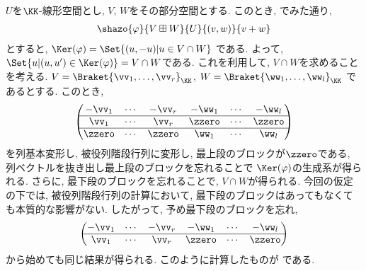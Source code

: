 \begin{remark}
  $U$を$\KK$-線形空間とし, $V$, $W$をその部分空間とする.
  このとき,
  でみた通り,
\begin{align*}
\shazo{\varphi}{V\boxplus W}{U}
{(v,w)}{v+w}
\end{align*}
とすると,
$\Ker(\varphi)=\Set{(u,-u) | u\in V\cap W}$
である.
よって,
$\Set{u|(u,u')\in \Ker(\varphi)}=V\cap W$である.
これを利用して, $V\cap W$を求めることを考える.
$V=\Braket{\vv_1,\ldots,\vv_r}_\KK$,
$W=\Braket{\ww_1,\ldots,\ww_l}_\KK$
であるとする.
このとき,
\begin{align*}
  \begin{pmatrix}
    -\vv_1&\cdots&-\vv_r&-\ww_1&\cdots&-\ww_l\\\hline
    \vv_1&\cdots&\vv_r&\zzero&\cdots&\zzero\\\hline
    \zzero&\cdots&\zzero&\ww_1&\cdots&\ww_l
  \end{pmatrix}
\end{align*}
を列基本変形し,
被役列階段行列に変形し, 最上段のブロックが$\zzero$である, 列ベクトルを抜き出し最上段のブロックを忘れることで
$\Ker(\varphi)$の生成系が得られる.
さらに, 最下段のブロックを忘れることで, $V\cap W$が得られる.
今回の仮定の下では,
被役列階段行列の計算において,
最下段のブロックはあってもなくても本質的な影響がない.
したがって, 予め最下段のブロックを忘れ,
\begin{align*}
  \begin{pmatrix}
    -\vv_1&\cdots&-\vv_r&-\ww_1&\cdots&-\ww_l\\\hline
    \vv_1&\cdots&\vv_r&\zzero&\cdots&\zzero
  \end{pmatrix}
\end{align*}
から始めても同じ結果が得られる.
このように計算したものが
である.
\end{remark}


